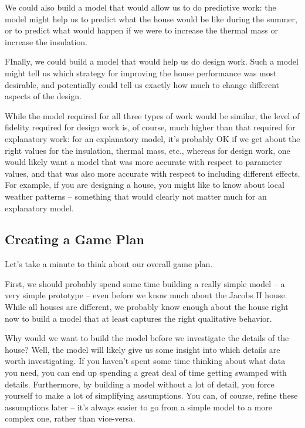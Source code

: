 \documentclass[10pt]{book}
\begin{document}
We could also build a model that would allow us to do predictive work: the model might help us to predict what the house would be like during the summer, or to predict what would happen if we were to increase the thermal mass or increase the insulation.

FInally, we could build a model that would help us do design work.  Such a model might tell us which strategy for improving the house performance was most desirable, and potentially could tell us exactly how much to change different aspects of the design.

While the model required for all three types of work would be similar, the level of fidelity required for design work is, of course, much higher than that required for explanatory work:  for an explanatory model, it's probably OK if we get about the right values for the insulation, thermal mass, etc., whereas for design work, one would likely want a model that was more accurate with respect to parameter values, and that was also more accurate with respect to including different effects.  For example, if you are designing a house, you might like to know about local weather patterns -- something that would clearly not matter much for an explanatory model.

\subsection{Creating a Game Plan}

Let's take a minute to think about our overall game plan.

First, we should probably spend some time building a really simple model -- a very simple prototype --  even before we know much about the Jacobs II house.  While all houses are different, we probably know enough about the house right now to build a model that at least captures the right qualitative behavior. 

Why would we want to build the model before we investigate the details of the house?  Well, the model will likely give us some insight into which details are worth investigating.  If you haven't spent some time thinking about what data you need, you can end up spending a great deal of time getting swamped with details.  Furthermore, by building a model without a lot of detail, you force yourself to make a lot of simplifying assumptions.  You can, of course, refine these assumptions later -- it's always easier to go from a simple model to a more complex one, rather than vice-versa.
\end{document}
